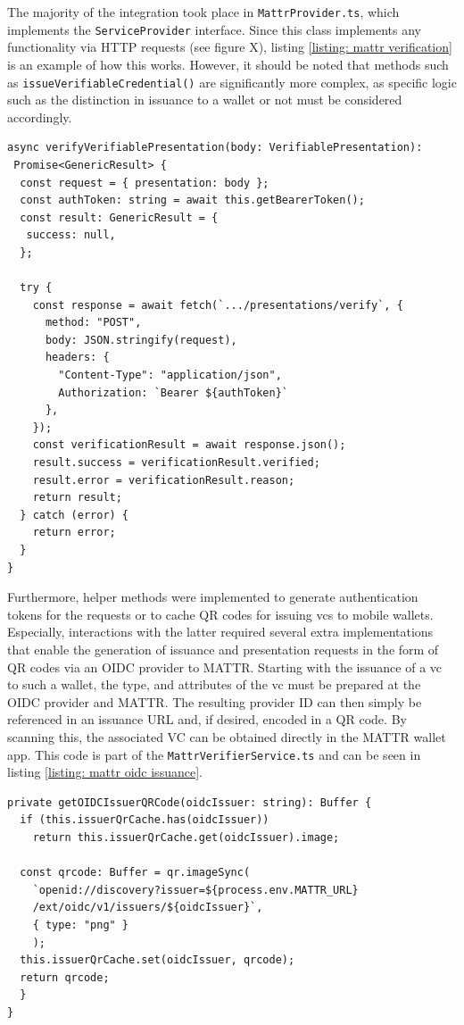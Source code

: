         The majority of the integration took place in \texttt{MattrProvider.ts}, which implements the \texttt{ServiceProvider} interface. Since this class implements any functionality via HTTP requests (see figure X), listing \ref{listing: mattr verification} is an example of how this works. However, it should be noted that methods such as \texttt{issueVerifiableCredential()} are significantly more complex, as specific logic such as the distinction in issuance to a wallet or not must be considered accordingly.
        \newline

\begin{lstlisting}[style=ES6, caption=Example of mattr verification implementation, label={listing: mattr verification}]
async verifyVerifiablePresentation(body: VerifiablePresentation): 
 Promise<GenericResult> {
  const request = { presentation: body };
  const authToken: string = await this.getBearerToken();
  const result: GenericResult = {
   success: null,
  };

  try {
    const response = await fetch(`.../presentations/verify`, {
      method: "POST",
      body: JSON.stringify(request),
      headers: { 
        "Content-Type": "application/json", 
        Authorization: `Bearer ${authToken}` 
      },
    });
    const verificationResult = await response.json();
    result.success = verificationResult.verified;
    result.error = verificationResult.reason;
    return result;
  } catch (error) {
    return error;
  }
}\end{lstlisting}
    
    Furthermore, helper methods were implemented to generate authentication tokens for the requests or to cache QR codes for issuing \acp{vc} to mobile wallets. Especially, interactions with the latter required several extra implementations that enable the generation of issuance and presentation requests in the form of QR codes via an OIDC provider to MATTR. Starting with the issuance of a \ac{vc} to such a wallet, the type, and attributes of the \ac{vc} must be prepared at the OIDC provider and MATTR. The resulting provider ID can then simply be referenced in an issuance URL and, if desired, encoded in a QR code. By scanning this, the associated VC can be obtained directly in the MATTR wallet app. This code is part of the \texttt{MattrVerifierService.ts} and can be seen in listing \ref{listing: mattr oidc issuance}.
    \newline
    
\begin{lstlisting}[style=ES6, caption=OIDC issuance QR code generation, label={listing: mattr oidc issuance}]
private getOIDCIssuerQRCode(oidcIssuer: string): Buffer {
  if (this.issuerQrCache.has(oidcIssuer)) 
    return this.issuerQrCache.get(oidcIssuer).image;

  const qrcode: Buffer = qr.imageSync(
    `openid://discovery?issuer=${process.env.MATTR_URL}
    /ext/oidc/v1/issuers/${oidcIssuer}`,
    { type: "png" }
    );
  this.issuerQrCache.set(oidcIssuer, qrcode);
  return qrcode;
  }
}\end{lstlisting}

